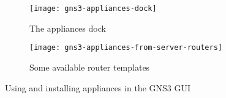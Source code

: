 \begin{figure}
     \centering
     \begin{subfigure}{0.4\textwidth}
         \centering
         \texttt{[image: gns3-appliances-dock]}
         \caption{The appliances dock}
         \label{fig:gns3-appliances-dock}
     \end{subfigure}
     \hfill
     \begin{subfigure}{0.5\textwidth}
         \centering
         \texttt{[image: gns3-appliances-from-server-routers]}
         \caption{Some available router templates}
         \label{fig:gns3-appliances-from-server-routers}
     \end{subfigure}
    \caption{Using and installing appliances in the GNS3 GUI}
    \label{fig:gns3-appliances}
\end{figure}


